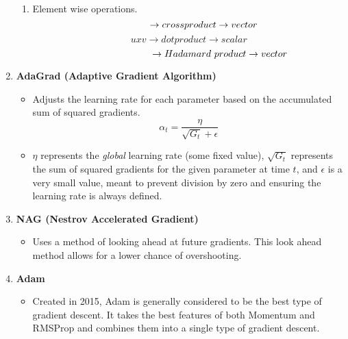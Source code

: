 \begin{enumerate}
\begin{enumerate}
        \item Element wise operations.
        \[
        \hspace{1.1cm} \rightarrow cross product \rightarrow vector
        \]
        \[
        uxv \rightarrow dot product \rightarrow scalar
        \]
        \[
        \hspace{2.3cm} \rightarrow Hadamard\ product \rightarrow vector
        \]
    \end{enumerate}
    \item \textbf{AdaGrad (Adaptive Gradient Algorithm)}
    \begin{itemize}
        \item Adjusts the learning rate for each parameter based on the accumulated sum of squared gradients.
        \[
        \alpha_t = \frac{\eta}{\sqrt{G_t}+\epsilon}
        \]
        \item $\eta$ represents the \textit{global} learning rate (some fixed value), $\sqrt{G_t}$ represents the sum of squared gradients for the given parameter at time $t$, and $\epsilon$ is a very small value, meant to prevent division by zero and ensuring the learning rate is always defined.
    \end{itemize}
    \item \textbf{NAG (Nestrov Accelerated Gradient)}
    \begin{itemize}
        \item Uses a method of looking ahead at future gradients. This look ahead method allows for a lower chance of overshooting.
    \end{itemize}
    \item \textbf{Adam}
    \begin{itemize}
        \item Created in 2015, Adam is generally considered to be the best type of gradient descent. It takes the best features of both Momentum and RMSProp and combines them into a single type of gradient descent.
    \end{itemize}
\end{enumerate}
